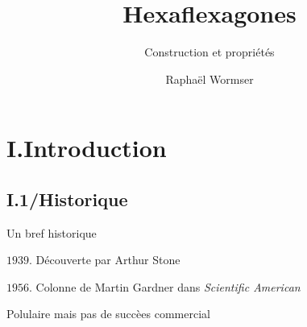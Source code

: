 \documentclass[french,xcolor=dvipsnames]{beamer}
\begin{document}
	\author{Raphaël Wormser}
	\title{Hexaflexagones}
	\subtitle{Construction et propriétés}
	\frame[plain]{\maketitle}
	

\AtBeginSection
{
}

	
	\section{I.Introduction}
		\subsection{I.1/Historique}
		\begin{frame}{Un bref historique}

			\begin{list}{Intro}{}
				\item[$\textit{1939}$.] Découverte  par Arthur Stone
				\item[$\textit{1956}$.]Colonne de Martin Gardner dans \textit{Scientific American}
				\item[Polulaire mais pas de succèes commercial]
			\end{list}
		\end{frame}
		
		
\end{document}
